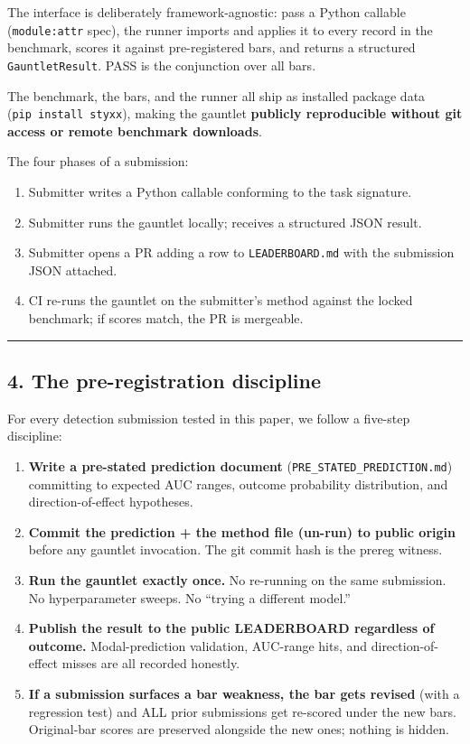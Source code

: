 \documentclass[
]{article}
\providecommand{\tightlist}{%
  \setlength{\itemsep}{0pt}\setlength{\parskip}{0pt}}
\begin{document}
The interface is deliberately framework-agnostic: pass a Python callable
(\texttt{module:attr} spec), the runner imports and applies it to every
record in the benchmark, scores it against pre-registered bars, and
returns a structured \texttt{GauntletResult}. PASS is the conjunction
over all bars.

The benchmark, the bars, and the runner all ship as installed package
data (\texttt{pip\ install\ styxx}), making the gauntlet
\textbf{publicly reproducible without git access or remote benchmark
downloads}.

The four phases of a submission:

\begin{enumerate}
\def\labelenumi{\arabic{enumi}.}
\tightlist
\item
  Submitter writes a Python callable conforming to the task signature.
\item
  Submitter runs the gauntlet locally; receives a structured JSON
  result.
\item
  Submitter opens a PR adding a row to \texttt{LEADERBOARD.md} with the
  submission JSON attached.
\item
  CI re-runs the gauntlet on the submitter's method against the locked
  benchmark; if scores match, the PR is mergeable.
\end{enumerate}

\begin{center}\rule{0.5\linewidth}{0.5pt}\end{center}

\subsection{4. The pre-registration
discipline}\label{the-pre-registration-discipline}

For every detection submission tested in this paper, we follow a
five-step discipline:

\begin{enumerate}
\def\labelenumi{\arabic{enumi}.}
\tightlist
\item
  \textbf{Write a pre-stated prediction document}
  (\texttt{PRE\_STATED\_PREDICTION.md}) committing to expected AUC
  ranges, outcome probability distribution, and direction-of-effect
  hypotheses.
\item
  \textbf{Commit the prediction + the method file (un-run) to public
  origin} before any gauntlet invocation. The git commit hash is the
  prereg witness.
\item
  \textbf{Run the gauntlet exactly once.} No re-running on the same
  submission. No hyperparameter sweeps. No ``trying a different model.''
\item
  \textbf{Publish the result to the public LEADERBOARD regardless of
  outcome.} Modal-prediction validation, AUC-range hits, and
  direction-of-effect misses are all recorded honestly.
\item
  \textbf{If a submission surfaces a bar weakness, the bar gets revised}
  (with a regression test) and ALL prior submissions get re-scored under
  the new bars. Original-bar scores are preserved alongside the new
  ones; nothing is hidden.
\end{enumerate}
\end{document}

